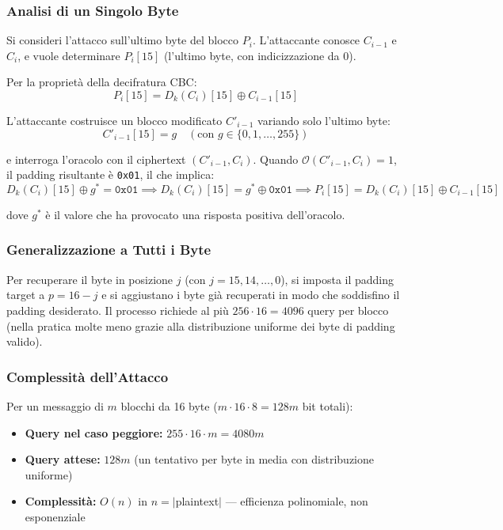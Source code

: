 \documentclass[12pt,a4paper]{article}
\begin{document}
\subsubsection{Analisi di un Singolo Byte}

Si consideri l'attacco sull'ultimo byte del blocco $P_i$. L'attaccante conosce $C_{i-1}$
e $C_i$, e vuole determinare $P_i[15]$ (l'ultimo byte, con indicizzazione da 0).

Per la proprietà della decifratura CBC:
\[
  P_i[15] = D_k(C_i)[15] \oplus C_{i-1}[15]
\]

L'attaccante costruisce un blocco modificato $C'_{i-1}$ variando solo l'ultimo byte:
\[
  C'_{i-1}[15] = g \quad (\text{con } g \in \{0, 1, \ldots, 255\})
\]

e interroga l'oracolo con il ciphertext $(C'_{i-1}, C_i)$. Quando $\mathcal{O}(C'_{i-1}, C_i) = 1$,
il padding risultante è \texttt{0x01}, il che implica:
\[
  D_k(C_i)[15] \oplus g^* = \texttt{0x01}
  \implies D_k(C_i)[15] = g^* \oplus \texttt{0x01}
  \implies P_i[15] = D_k(C_i)[15] \oplus C_{i-1}[15]
\]

dove $g^*$ è il valore che ha provocato una risposta positiva dell'oracolo.

\subsubsection{Generalizzazione a Tutti i Byte}

Per recuperare il byte in posizione $j$ (con $j = 15, 14, \ldots, 0$), si imposta il padding
target a $p = 16 - j$ e si aggiustano i byte già recuperati in modo che soddisfino il padding
desiderato. Il processo richiede al più $256 \cdot 16 = 4096$ query per blocco
(nella pratica molte meno grazie alla distribuzione uniforme dei byte di padding valido).

\subsubsection{Complessità dell'Attacco}

Per un messaggio di $m$ blocchi da 16 byte ($m \cdot 16 \cdot 8 = 128m$ bit totali):
\begin{itemize}
  \item \textbf{Query nel caso peggiore:} $255 \cdot 16 \cdot m = 4080m$
  \item \textbf{Query attese:} $128m$ (un tentativo per byte in media con distribuzione uniforme)
  \item \textbf{Complessità:} $O(n)$ in $n = |$plaintext$|$ — efficienza polinomiale, non esponenziale
\end{itemize}
\end{document}
